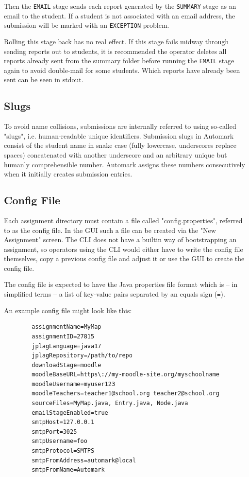 \documentclass[12pt,a4paper,oneside]{report}
\begin{document}
	\pagebreak
	Then the \lstinline|EMAIL| stage sends each report generated by the \lstinline|SUMMARY| stage as an email to the student. If a student is not associated with an email address, the submission will be marked with an \lstinline|EXCEPTION| problem.

	Rolling this stage back has no real effect. If this stage fails midway through sending reports out to students, it is recommended the operator deletes all reports already sent from the summary folder before running the \lstinline|EMAIL| stage again to avoid double-mail for some students. Which reports have already been sent can be seen in stdout.

	\subsection{Slugs} \label{subsec:slugs}
	To avoid name collisions, submissions are internally referred to using so-called "slugs", i.e. human-readable unique identifiers. Submission slugs in Automark consist of the student name in snake case (fully lowercase, underscores replace spaces) concatenated with another underscore and an arbitrary unique but humanly comprehensible number. Automark assigns these numbers consecutively when it initially creates submission entries.

	\subsection{Config File}
	Each assignment directory must contain a file called "config.properties", referred to as the config file. In the GUI such a file can be created via the "New Assignment" screen. The CLI does not have a builtin way of bootstrapping an assignment, so operators using the CLI would either have to write the config file themselves, copy a previous config file and adjust it or use the GUI to create the config file.

	The config file is expected to have the Java properties file format which is -- in simplified terms -- a list of key-value pairs separated by an equals sign (\lstinline|=|).

	An example config file might look like this:
	\begin{lstlisting}
		assignmentName=MyMap
		assignmentID=27815
		jplagLanguage=java17
		jplagRepository=/path/to/repo
		downloadStage=moodle
		moodleBaseURL=https\://my-moodle-site.org/myschoolname
		moodleUsername=myuser123
		moodleTeachers=teacher1@school.org teacher2@school.org
		sourceFiles=MyMap.java, Entry.java, Node.java
		emailStageEnabled=true
		smtpHost=127.0.0.1
		smtpPort=3025
		smtpUsername=foo
		smtpProtocol=SMTPS
		smtpFromAddress=automark@local
		smtpFromName=Automark
	\end{lstlisting}
\end{document}

